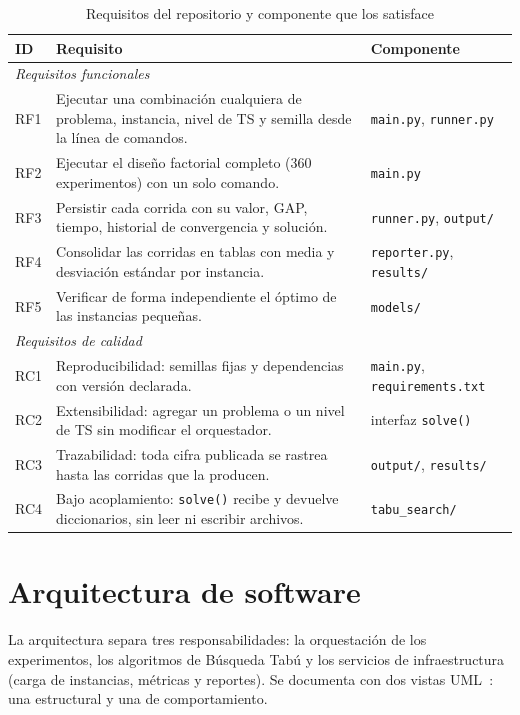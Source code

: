 \begin{table}[H]
\centering
\caption{Requisitos del repositorio y componente que los satisface}
\label{tab:requisitos}
\small
\begin{tabular}{lp{8.3cm}p{3.7cm}}
\toprule
\textbf{ID} & \textbf{Requisito} & \textbf{Componente} \\
\midrule
\multicolumn{3}{l}{\emph{Requisitos funcionales}} \\
RF1 & Ejecutar una combinación cualquiera de problema, instancia, nivel de
      TS y semilla desde la línea de comandos.
    & \texttt{main.py}, \texttt{runner.py} \\
RF2 & Ejecutar el diseño factorial completo (360 experimentos) con un solo
      comando.
    & \texttt{main.py} \\
RF3 & Persistir cada corrida con su valor, GAP, tiempo, historial de
      convergencia y solución.
    & \texttt{runner.py}, \texttt{output/} \\
RF4 & Consolidar las corridas en tablas con media y desviación estándar por
      instancia.
    & \texttt{reporter.py}, \texttt{results/} \\
RF5 & Verificar de forma independiente el óptimo de las instancias pequeñas.
    & \texttt{models/} \\
\midrule
\multicolumn{3}{l}{\emph{Requisitos de calidad}} \\
RC1 & Reproducibilidad: semillas fijas y dependencias con versión declarada.
    & \texttt{main.py}, \texttt{requirements.txt} \\
RC2 & Extensibilidad: agregar un problema o un nivel de TS sin modificar el
      orquestador.
    & interfaz \texttt{solve()} \\
RC3 & Trazabilidad: toda cifra publicada se rastrea hasta las corridas que
      la producen.
    & \texttt{output/}, \texttt{results/} \\
RC4 & Bajo acoplamiento: \texttt{solve()} recibe y devuelve diccionarios,
      sin leer ni escribir archivos.
    & \texttt{tabu\_search/} \\
\bottomrule
\end{tabular}
\end{table}

\section{Arquitectura de software}
\label{sec:arquitectura}

La arquitectura separa tres responsabilidades: la orquestación de los
experimentos, los algoritmos de Búsqueda Tabú y los servicios de
infraestructura (carga de instancias, métricas y reportes). Se documenta con
dos vistas UML~\cite{fowler2003uml}: una estructural y una de comportamiento.

